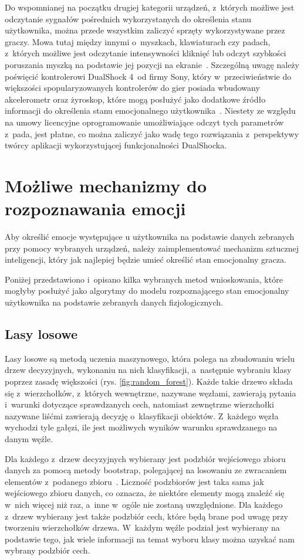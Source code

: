Do wspomnianej na początku drugiej kategorii urządzeń, z~których możliwe jest odczytanie sygnałów pośrednich wykorzystanych do określenia stanu użytkownika, można przede wszystkim zaliczyć sprzęty wykorzystywane przez graczy. Mowa tutaj między innymi o~myszkach, klawiaturach czy padach, z~których możliwe jest odczytanie intensywności kliknięć lub odczyt szybkości poruszania myszką na podstawie jej pozycji na ekranie~\cite{measuring_emotion_from_gamepad}. Szczególną uwagę należy poświęcić kontrolerowi DualShock 4~od firmy Sony, który w~przeciwieństwie do większości spopularyzowanych kontrolerów do gier posiada wbudowany akcelerometr oraz żyroskop, które mogą posłużyć jako dodatkowe źródło informacji do określenia stanu emocjonalnego użytkownika~\cite{dualshock_specification}. Niestety ze względu na umowy licencyjne oprogramowanie umożliwiające odczyt tych parametrów z~pada, jest płatne, co można zaliczyć jako wadę tego rozwiązania z~perspektywy twórcy aplikacji wykorzystującej funkcjonalności DualShocka.

\section{Możliwe mechanizmy do rozpoznawania emocji}
Aby określić emocje występujące u użytkownika na podstawie danych zebranych przy pomocy wybranych urządzeń, należy zaimplementować mechanizm sztucznej inteligencji, który jak najlepiej będzie umieć określić stan emocjonalny gracza. 

Poniżej przedstawiono i~opisano kilka wybranych metod wnioskowania, które mogłyby posłużyć jako algorytmy do modelu rozpoznającego stan emocjonalny użytkownika na podstawie zebranych danych fizjologicznych.

\subsection{Lasy losowe}
Lasy losowe są metodą uczenia maszynowego, która polega na zbudowaniu wielu drzew decyzyjnych, wykonaniu na nich klasyfikacji, a~następnie wybraniu klasy poprzez zasadę większości (rys. \ref{fig:random_forest}). Każde takie drzewo składa się z~wierzchołków, z~których wewnętrzne, nazywane węzłami, zawierają pytania i~warunki dotyczące sprawdzanych cech, natomiast zewnętrzne wierzchołki nazywane liśćmi zawierają decyzję o~klasyfikacji obiektów. Z~każdego węzła wychodzi tyle gałęzi, ile jest możliwych wyników warunku sprawdzanego na danym węźle.

Dla każdego z~drzew decyzyjnych wybierany jest podzbiór wejściowego zbioru danych za pomocą metody bootstrap, polegającej na losowaniu ze zwracaniem elementów z~podanego zbioru~\cite{flach_2012}. Liczność podzbiorów jest taka sama jak wejściowego zbioru danych, co oznacza, że niektóre elementy mogą znaleźć się w~nich więcej niż raz, a~inne w~ogóle nie zostaną uwzględnione. Dla każdego z~drzew wybierany jest także podzbiór cech, które będą brane pod uwagę przy tworzeniu wierzchołków drzewa. W~każdym węźle podział jest wybierany na podstawie tego, jak wiele informacji na temat wyboru klasy można uzyskać nam wybrany podzbiór cech.

